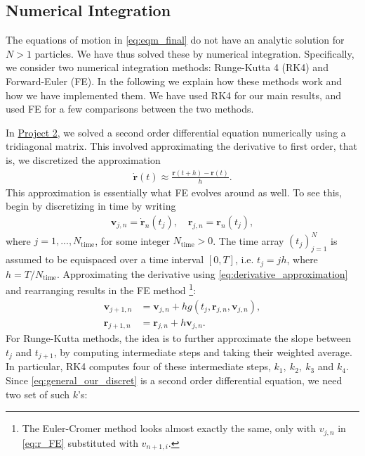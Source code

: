 \documentclass[english,notitlepage,reprint]{revtex4-2}  %
\renewcommand{\vec}[1]{\mathbf{#1}}
\begin{document}
\subsection{Numerical Integration}
The equations of motion in \eqref{eq:eqm_final} do not have an analytic solution for \(N>1\) particles. We have thus solved these by numerical integration. Specifically, we consider two numerical integration methods: Runge-Kutta 4 (RK4) and Forward-Euler (FE). In the following we explain how these methods work and how we have implemented them. We have used RK4 for our main results, and used FE for a few comparisons between the two methods.

In \href{https://github.uio.no/icrukan/FYS4150/tree/master/Project2}{Project 2}, we solved a second order differential equation numerically using a tridiagonal matrix. This involved approximating the derivative to first order, that is, we discretized the approximation
\begin{align}
    \dot{\vec{r}}(t) \approx \frac{\vec{r}(t+h) - \vec{r}(t)}{h}. \label{eq:derivative_approximation}
\end{align}  
This approximation is essentially what FE evolves around as well. To see this, begin by discretizing in time by writing 
\begin{align}
    \vec{v}_{j,n} = \dot{\vec{r}}_n(t_j), \quad \vec{r}_{j,n} = \vec{r}_n(t_j), \label{eq:general_our_discret}
\end{align} 
where \(j=1, ..., N_{\text{time}}\), for some integer \(N_{\text{time}}>0\). The time array \((t_j)_{j=1}^{N}\) is assumed to be equispaced over a time interval \([0,T]\), i.e. \(t_j = jh\), where \(h=T/N_{\text{time}}\). 
Approximating the derivative using \eqref{eq:derivative_approximation} and rearranging results in the FE method \footnote{The Euler-Cromer method looks almost exactly the same, only with \(v_{j,n}\) in \eqref{eq:r_FE} substituted with \(v_{n+1,i}\). }: 
\begin{subequations}    \label{eq:FE_general_algorithm}
    \begin{align}
        \vec{v}_{j+1,n} &= \vec{v}_{j,n} + hg(t_j,  \vec{r}_{j,n}, \vec{v}_{j,n}), \\ 
        \vec{r}_{j+1,n} &= \vec{r}_{j,n} + h\vec{v}_{j,n}. \label{eq:r_FE}
    \end{align}
\end{subequations}
For Runge-Kutta methods, the idea is to further approximate the slope between \(t_j\) and \(t_{j+1}\), by computing intermediate steps and taking their weighted average. In particular, RK4 computes four of these intermediate steps, \(k_1, \ k_2, \ k_3\) and \(k_4\). Since \eqref{eq:general_our_discret} is a second order differential equation, we need two set of such \(k\)'s:
\end{document}
